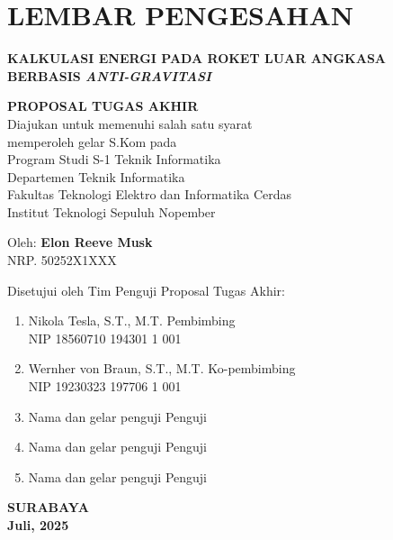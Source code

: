 \chapter*{LEMBAR PENGESAHAN}

\thispagestyle{empty}

\begin{center}
  \textbf{KALKULASI ENERGI PADA ROKET LUAR ANGKASA BERBASIS \emph{ANTI-GRAVITASI}}
\end{center}

\begingroup
\small

\begin{center}
  \textbf{PROPOSAL TUGAS AKHIR} \\
  Diajukan untuk memenuhi salah satu syarat \\ 
  memperoleh gelar S.Kom pada \\
  Program Studi S-1 Teknik Informatika \\
  Departemen Teknik Informatika \\
  Fakultas Teknologi Elektro dan Informatika Cerdas \\
  Institut Teknologi Sepuluh Nopember
\end{center}

\vspace{5ex}

\begin{center}
  Oleh: \textbf{Elon Reeve Musk} \\
  NRP. 50252X1XXX
\end{center}

\begin{center}
  Disetujui oleh Tim Penguji Proposal Tugas Akhir:
\end{center}

\begin{enumerate}
  \item Nikola Tesla, S.T., M.T. \hfill Pembimbing \\
        NIP 18560710 194301 1 001
  \item Wernher von Braun, S.T., M.T. \hfill Ko-pembimbing \\
        NIP 19230323 197706 1 001
  
  \item Nama dan gelar penguji \hfill Penguji
  
  \item Nama dan gelar penguji \hfill Penguji
  
  \item Nama dan gelar penguji \hfill Penguji
\end{enumerate}

\vspace{\fill}

\begin{center}
  \textbf{SURABAYA} \\
  \textbf{Juli, 2025}
\end{center}
\endgroup
